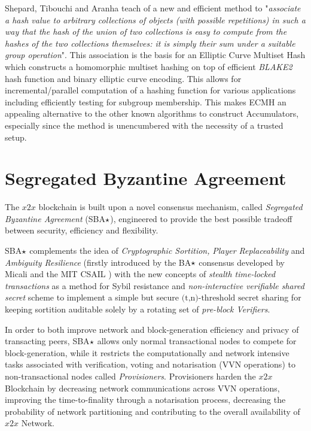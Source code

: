 Shepard, Tibouchi and Aranha \cite{ecmh} teach of a new and efficient method to "\textit{associate a hash value to arbitrary collections of objects (with possible repetitions) in such a way that the hash of the union of two collections is easy to compute from the hashes of the two collections themselves:  it is simply their sum under a suitable group operation}". This association is the basis for an Elliptic Curve Multiset Hash which constructs a homomorphic multiset hashing on top of efficient \textit{BLAKE2} hash function and binary elliptic curve encoding. This allows for incremental/parallel computation of a hashing function for various applications including efficiently testing for subgroup membership. This makes ECMH an appealing alternative to the other known algorithms to construct Accumulators, especially since the method is unencumbered with the necessity of a trusted setup.

\section{Segregated Byzantine Agreement}
\label{sec:SBA}

The $x2x$ blockchain is built upon a novel consensus mechanism, called \textit{Segregated Byzantine Agreement} (SBA$\large\star$), engineered to provide the best possible tradeoff between security, efficiency and flexibility. 

SBA$\large\star$ complements the idea of \textit{Cryptographic Sortition,} \textit{Player Replaceability} and \textit{Ambiguity Resilience} (firstly introduced by the BA$\large\star$ consensus developed by Micali and the MIT CSAIL \cite{algorand}) with the new concepts of \textit{stealth time-locked transactions} as a method for Sybil resistance and \textit{non-interactive verifiable shared secret} scheme to implement a simple but secure $\textrm{(t,n)-threshold secret}$ sharing for keeping sortition auditable solely by a rotating set of \textit{pre-block Verifiers}.

In order to both improve network and block-generation efficiency and privacy of transacting peers, SBA$\large\star$ allows only normal transactional nodes to compete for block-generation, while it restricts the computationally and network intensive tasks associated with verification, voting and notarisation (VVN operations) to non-transactional nodes called \textit{Provisioners}. Provisioners harden the $x2x$ Blockchain by decreasing network communications across VVN operations, improving the time-to-finality through a notarisation process, decreasing the probability of network partitioning and contributing to the overall availability of $x2x$ Network.

